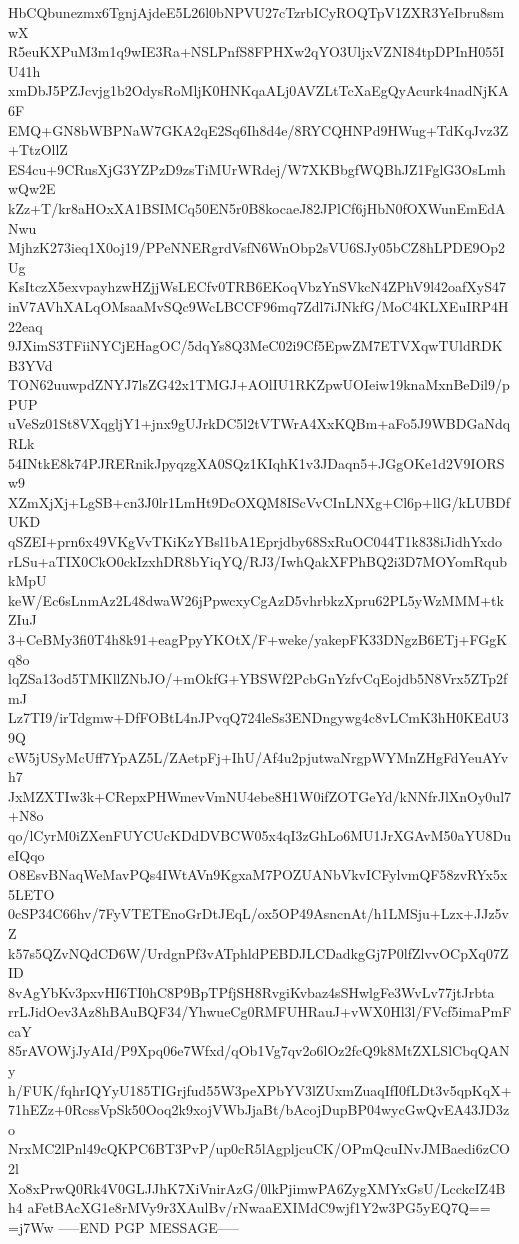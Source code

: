 HbCQbunezmx6TgnjAjdeE5L26l0bNPVU27cTzrbICyROQTpV1ZXR3YeIbru8smwX
R5euKXPuM3m1q9wIE3Ra+NSLPnfS8FPHXw2qYO3UljxVZNI84tpDPInH055IU41h
xmDbJ5PZJcvjg1b2OdysRoMljK0HNKqaALj0AVZLtTcXaEgQyAcurk4nadNjKA6F
EMQ+GN8bWBPNaW7GKA2qE2Sq6Ih8d4e/8RYCQHNPd9HWug+TdKqJvz3Z+TtzOllZ
ES4cu+9CRusXjG3YZPzD9zsTiMUrWRdej/W7XKBbgfWQBhJZ1FglG3OsLmhwQw2E
kZz+T/kr8aHOxXA1BSIMCq50EN5r0B8kocaeJ82JPlCf6jHbN0fOXWunEmEdANwu
MjhzK273ieq1X0oj19/PPeNNERgrdVsfN6WnObp2sVU6SJy05bCZ8hLPDE9Op2Ug
KsItczX5exvpayhzwHZjjWsLECfv0TRB6EKoqVbzYnSVkcN4ZPhV9l42oafXyS47
inV7AVhXALqOMsaaMvSQc9WcLBCCF96mq7Zdl7iJNkfG/MoC4KLXEuIRP4H22eaq
9JXimS3TFiiNYCjEHagOC/5dqYs8Q3MeC02i9Cf5EpwZM7ETVXqwTUldRDKB3YVd
TON62uuwpdZNYJ7lsZG42x1TMGJ+AOlIU1RKZpwUOIeiw19knaMxnBeDil9/pPUP
uVeSz01St8VXqgljY1+jnx9gUJrkDC5l2tVTWrA4XxKQBm+aFo5J9WBDGaNdqRLk
54INtkE8k74PJRERnikJpyqzgXA0SQz1KIqhK1v3JDaqn5+JGgOKe1d2V9IORSw9
XZmXjXj+LgSB+cn3J0lr1LmHt9DcOXQM8IScVvCInLNXg+Cl6p+llG/kLUBDfUKD
qSZEI+prn6x49VKgVvTKiKzYBsl1bA1Eprjdby68SxRuOC044T1k838iJidhYxdo
rLSu+aTIX0CkO0ckIzxhDR8bYiqYQ/RJ3/IwhQakXFPhBQ2i3D7MOYomRqubkMpU
keW/Ec6sLnmAz2L48dwaW26jPpwcxyCgAzD5vhrbkzXpru62PL5yWzMMM+tkZIuJ
3+CeBMy3fi0T4h8k91+eagPpyYKOtX/F+weke/yakepFK33DNgzB6ETj+FGgKq8o
lqZSa13od5TMKllZNbJO/+mOkfG+YBSWf2PcbGnYzfvCqEojdb5N8Vrx5ZTp2fmJ
Lz7TI9/irTdgmw+DfFOBtL4nJPvqQ724leSs3ENDngywg4c8vLCmK3hH0KEdU39Q
cW5jUSyMcUff7YpAZ5L/ZAetpFj+IhU/Af4u2pjutwaNrgpWYMnZHgFdYeuAYvh7
JxMZXTIw3k+CRepxPHWmevVmNU4ebe8H1W0ifZOTGeYd/kNNfrJlXnOy0ul7+N8o
qo/lCyrM0iZXenFUYCUcKDdDVBCW05x4qI3zGhLo6MU1JrXGAvM50aYU8DueIQqo
O8EsvBNaqWeMavPQs4IWtAVn9KgxaM7POZUANbVkvICFylvmQF58zvRYx5x5LETO
0cSP34C66hv/7FyVTETEnoGrDtJEqL/ox5OP49AsncnAt/h1LMSju+Lzx+JJz5vZ
k57s5QZvNQdCD6W/UrdgnPf3vATphldPEBDJLCDadkgGj7P0lfZlvvOCpXq07ZID
8vAgYbKv3pxvHI6TI0hC8P9BpTPfjSH8RvgiKvbaz4sSHwlgFe3WvLv77jtJrbta
rrLJidOev3Az8hBAuBQF34/YhwueCg0RMFUHRauJ+vWX0Hl3l/FVcf5imaPmFcaY
85rAVOWjJyAId/P9Xpq06e7Wfxd/qOb1Vg7qv2o6lOz2fcQ9k8MtZXLSlCbqQANy
h/FUK/fqhrIQYyU185TIGrjfud55W3peXPbYV3lZUxmZuaqIfI0fLDt3v5qpKqX+
71hEZz+0RcssVpSk50Ooq2k9xojVWbJjaBt/bAcojDupBP04wycGwQvEA43JD3zo
NrxMC2lPnl49cQKPC6BT3PvP/up0cR5lAgpljcuCK/OPmQcuINvJMBaedi6zCO2l
Xo8xPrwQ0Rk4V0GLJJhK7XiVnirAzG/0lkPjimwPA6ZygXMYxGsU/LcckcIZ4Bh4
aFetBAcXG1e8rMVy9r3XAulBv/rNwaaEXIMdC9wjf1Y2w3PG5yEQ7Q==
=j7Ww
-----END PGP MESSAGE-----
